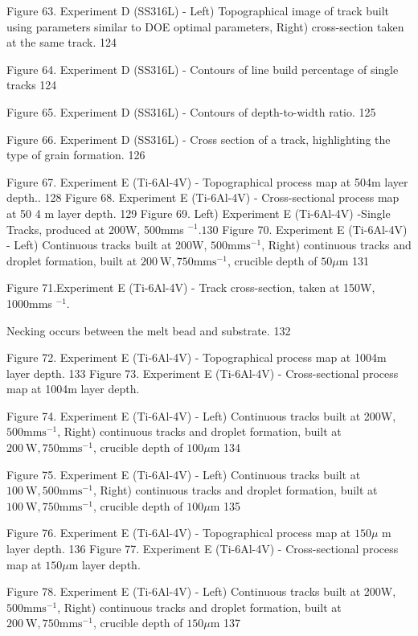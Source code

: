 \documentclass[10pt]{article}
\begin{document}
Figure 63. Experiment D (SS316L) - Left) Topographical image of track built using parameters similar to DOE optimal parameters, Right) cross-section taken at the same track. 124

Figure 64. Experiment D (SS316L) - Contours of line build percentage of single tracks 124

Figure 65. Experiment D (SS316L) - Contours of depth-to-width ratio. 125

Figure 66. Experiment D (SS316L) - Cross section of a track, highlighting the type of grain formation. 126

Figure 67. Experiment E (Ti-6Al-4V) - Topographical process map at 504m layer depth.. 128 Figure 68. Experiment E (Ti-6Al-4V) - Cross-sectional process map at 50 4 m layer depth. 129 Figure 69. Left) Experiment E (Ti-6Al-4V) -Single Tracks, produced at 200W, 500mms ${ }^{-1} .130$ Figure 70. Experiment E (Ti-6Al-4V) - Left) Continuous tracks built at 200W, $500 \mathrm{mms}^{-1}$, Right) continuous tracks and droplet formation, built at $200 \mathrm{~W}, 750 \mathrm{mms}^{-1}$, crucible depth of $50 \mu \mathrm{m}$ 131

Figure 71.Experiment E (Ti-6Al-4V) - Track cross-section, taken at 150W, 1000mms ${ }^{-1}$.

Necking occurs between the melt bead and substrate. 132

Figure 72. Experiment E (Ti-6Al-4V) - Topographical process map at 1004m layer depth. 133 Figure 73. Experiment E (Ti-6Al-4V) - Cross-sectional process map at 1004m layer depth.

Figure 74. Experiment E (Ti-6Al-4V) - Left) Continuous tracks built at 200W, $500 \mathrm{mms}^{-1}$, Right) continuous tracks and droplet formation, built at $200 \mathrm{~W}, 750 \mathrm{mms}^{-1}$, crucible depth of $100 \mu \mathrm{m}$ 134

Figure 75. Experiment E (Ti-6Al-4V) - Left) Continuous tracks built at $100 \mathrm{~W}, 500 \mathrm{mms}^{-1}$, Right) continuous tracks and droplet formation, built at $100 \mathrm{~W}, 750 \mathrm{mms}^{-1}$, crucible depth of $100 \mu \mathrm{m}$ 135

Figure 76. Experiment E (Ti-6Al-4V) - Topographical process map at $150 \mu$ m layer depth. 136 Figure 77. Experiment E (Ti-6Al-4V) - Cross-sectional process map at $150 \mu \mathrm{m}$ layer depth.

Figure 78. Experiment E (Ti-6Al-4V) - Left) Continuous tracks built at 200W, $500 \mathrm{mms}^{-1}$, Right) continuous tracks and droplet formation, built at $200 \mathrm{~W}, 750 \mathrm{mms}^{-1}$, crucible depth of $150 \mu \mathrm{m}$ 137
\end{document}
